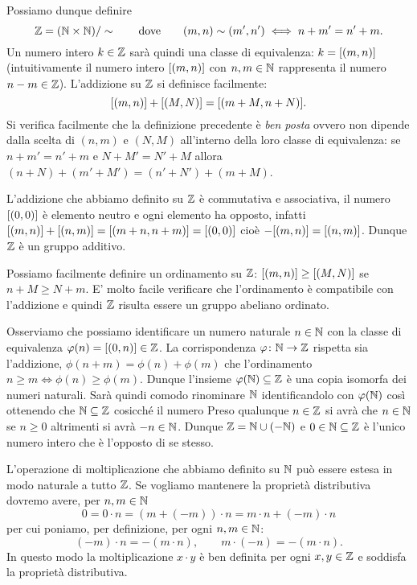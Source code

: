 Possiamo dunque definire 
\[
  {\mathbb Z} = ({\mathbb N} \times {\mathbb N})/\sim
  \qquad\text{dove}\qquad
  (m,n)\sim (m',n')\iff n+m' = n'+m.
\]
Un numero intero $k\in {\mathbb Z}$ sarà quindi una classe di equivalenza:
$k = {\left[ (m,n) \right]}$ (intuitivamente il numero intero ${\left[ (m,n) \right]}$ 
con $n,m\in {\mathbb N}$ 
rappresenta il numero $n-m\in {\mathbb Z}$).
L'addizione su ${\mathbb Z}$ si definisce facilmente:
\[
 {\left[ (m,n) \right]}+{\left[ (M,N) \right]} = {\left[ (m+M,n+N) \right]}.
\]
Si verifica facilmente che la definizione precedente è \emph{ben posta}
ovvero non dipende dalla scelta di $(n,m)$ e $(N,M)$ all'interno 
della loro classe di equivalenza: se $n+m' = n'+m$ e $N+M'=N'+M$ 
allora $(n+N)+(m'+M')=(n'+N')+(m+M)$.

L'addizione che abbiamo definito su ${\mathbb Z}$ è commutativa e associativa, 
il numero ${\left[ (0,0) \right]}$
è elemento neutro e ogni elemento ha opposto, infatti 
${\left[ (m,n) \right]} + {\left[ (n,m) \right]} = {\left[ (m+n,n+m) \right]}={\left[ (0,0) \right]}$
cioè $-{\left[ (m,n) \right]}={\left[ (n,m) \right]}$.
Dunque ${\mathbb Z}$ è un gruppo additivo.

Possiamo facilmente definire un ordinamento su ${\mathbb Z}$:
${\left[ (m,n) \right]} \ge {\left[ (M,N) \right]}$ se 
$n+M\ge N+m$.
E' molto facile verificare che l'ordinamento è compatibile 
con l'addizione e quindi ${\mathbb Z}$ risulta essere un gruppo abeliano ordinato.

Osserviamo che possiamo identificare un numero naturale $n\in {\mathbb N}$ 
con la classe di equivalenza $\varphi(n) = {\left[ (0,n) \right]}\in {\mathbb Z}$.
La corrispondenza $\varphi\colon {\mathbb N}\to{\mathbb Z}$ rispetta sia l'addizione,
$\phi(n+m) = \phi(n)+\phi(m)$ che l'ordinamento $n\ge m \iff \phi(n)\ge \phi(m)$.
Dunque l'insieme $\varphi({\mathbb N})\subseteq {\mathbb Z}$ è una copia isomorfa dei 
numeri naturali. 
%
Sarà quindi comodo rinominare ${\mathbb N}$ identificandolo con $\varphi({\mathbb N})$ così 
ottenendo che ${\mathbb N}\subseteq {\mathbb Z}$ cosicché il numero 
Preso qualunque $n\in {\mathbb Z}$ si avrà che $n\in {\mathbb N}$ se $n\ge 0$ altrimenti 
si avrà $-n\in {\mathbb N}$. 
Dunque ${\mathbb Z} = {\mathbb N} \cup (-{\mathbb N})$ e $0\in {\mathbb N}\subseteq {\mathbb Z}$ 
è l'unico numero intero che è l'opposto di se stesso.

L'operazione di moltiplicazione che abbiamo definito su ${\mathbb N}$ può essere 
estesa in modo naturale a tutto ${\mathbb Z}$. 
Se vogliamo mantenere la proprietà distributiva dovremo avere, 
per $n,m\in{\mathbb N}$
\[
  0 = 0 \cdot n = (m+(-m))\cdot n = m\cdot n + (-m)\cdot n
\]
per cui poniamo, per definizione, per ogni $n,m\in {\mathbb N}$:
\[
  (-m) \cdot n = -(m\cdot n), \qquad  m \cdot (-n) = -(m\cdot n).
\]
In questo modo la moltiplicazione $x\cdot y$ 
è ben definita per ogni $x,y\in {\mathbb Z}$ e soddisfa la proprietà distributiva.

